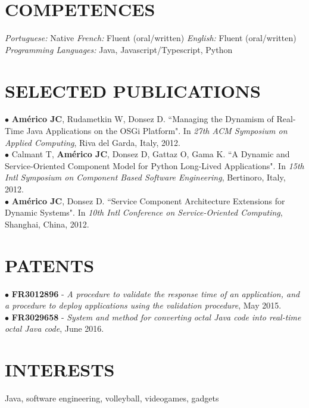 \documentclass[margin]{res}
\begin{document}
\begin{resume}
		\section{COMPETENCES} {\sl Portuguese:} Native \hfill {\sl French:} Fluent (oral/written) \hfill {\sl English:} Fluent (oral/written)\\
			{\sl Programming Languages:} Java, Javascript/Typescript, Python\\
		\vspace{-6mm}
		\section{SELECTED PUBLICATIONS} 	
			$\bullet$ {\bf Am\'{e}rico JC}, Rudametkin W, Donsez D. ``Managing the Dynamism of Real-Time Java Applications on the OSGi Platform". In {\sl 27th ACM Symposium on Applied Computing}, Riva del Garda, Italy, 2012. 
			\vspace{1mm}\\
			$\bullet$ Calmant T, {\bf Am\'{e}rico JC}, Donsez D, Gattaz O, Gama K. ``A Dynamic and Service-Oriented Component Model for Python Long-Lived Applications". In {\sl 15th Intl Symposium on Component Based Software Engineering}, Bertinoro, Italy, 2012.
			\vspace{1mm}\\
			$\bullet$ {\bf Am\'{e}rico JC}, Donsez D. ``Service Component Architecture Extensions for Dynamic Systems". In {\sl 10th Intl Conference on Service-Oriented Computing}, Shanghai, China, 2012.
			\vspace{-2mm} 
		\section{PATENTS} 	
			$\bullet$ {\bf FR3012896} - {\sl A procedure to validate the response time of an application, and a procedure to deploy applications using the validation procedure}, May 2015.
			\vspace{1mm}\\
			$\bullet$ {\bf FR3029658} - {\sl System and method for converting octal Java code into real-time octal Java code}, June 2016.
			\vspace{-2mm} 
		\section{INTERESTS} Java, software engineering, volleyball, videogames, gadgets
	\end{resume}
\end{document}
